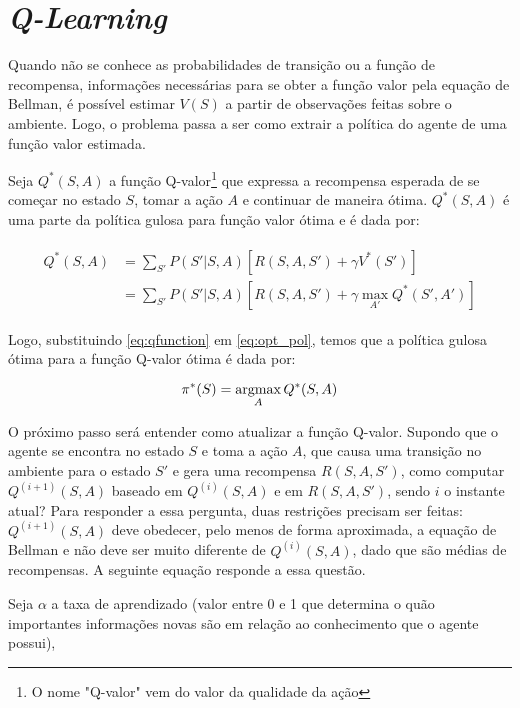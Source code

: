 
\section{\textit{Q-Learning}}
\label{sec:ql}

Quando não se conhece as probabilidades de transição ou a função de recompensa, informações necessárias para se obter a função valor pela equação de Bellman, é possível estimar $V(S)$ a partir de observações feitas sobre o ambiente.
Logo, o problema passa a ser como extrair a política do agente de uma função valor estimada.

Seja $Q^{*}(S,A)$ a função Q-valor\footnote{O nome "Q-valor"{} vem do valor da qualidade da ação} que expressa a recompensa esperada de se começar no estado $S$, tomar a ação $A$ e continuar de maneira ótima. $Q^{*}(S,A)$ é uma parte da política gulosa para função valor ótima e é dada por:

\begin{align}
\begin{split}
Q^{*}(S,A) &= \sum_{S'}P(S'|S,A)[R(S,A,S') + \gamma V^{*}(S')] \\
        &= \sum_{S'}P(S'|S,A)[R(S,A,S') + \gamma \max_{A'}Q^{*}(S',A')]
\end{split}
\label{eq:qfunction}
\end{align}

Logo, substituindo \ref{eq:qfunction} em \ref{eq:opt_pol}, temos que a política gulosa ótima para a função Q-valor ótima é dada por:

\begin{equation} \label{eq:q_opt_pol}
\pi^{*}(S) = \operatorname*{argmax}_{A}Q^{*}(S,A)
\end{equation}

O próximo passo será entender como atualizar a função Q-valor.
Supondo que o agente se encontra no estado $S$ e toma a ação $A$, que causa uma transição no ambiente para o estado $S'$ e gera uma recompensa $R(S,A,S')$, como computar $Q^{(i+1)}(S,A)$ baseado em $Q^{(i)}(S,A)$ e em $R(S,A,S')$, sendo $i$ o instante atual?
Para responder a essa pergunta, duas restrições precisam ser feitas: $Q^{(i+1)}(S,A)$ deve obedecer, pelo menos de forma aproximada, a equação de Bellman e não deve ser muito diferente de $Q^{(i)}(S,A)$, dado que são médias de recompensas.
A seguinte equação responde a essa questão.

Seja $\alpha$ a taxa de aprendizado (valor entre 0 e 1 que determina o quão importantes informações novas são em relação ao conhecimento que o agente possui),

